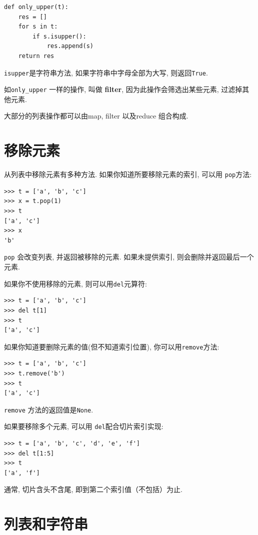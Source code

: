 \documentclass[10pt]{book}
\begin{document}
\begin{verbatim}
def only_upper(t):
    res = []
    for s in t:
        if s.isupper():
            res.append(s)
    return res
\end{verbatim}
%
{\tt isupper}是字符串方法, 如果字符串中字母全部为大写, 则返回{\tt True}. 

如\verb"only_upper" 一样的操作, 叫做 {\bf filter}, 因为此操作会筛选出某些元素, 
过滤掉其他元素. 

大部分的列表操作都可以由map, filter 以及reduce 组合构成. 


\section{移除元素}

从列表中移除元素有多种方法. 
如果你知道所要移除元素的索引, 可以用
{\tt pop}方法:

\begin{verbatim}
>>> t = ['a', 'b', 'c']
>>> x = t.pop(1)
>>> t
['a', 'c']
>>> x
'b'
\end{verbatim}
%
{\tt pop} 会改变列表, 并返回被移除的元素. 
如果未提供索引, 则会删除并返回最后一个元素. 

如果你不使用移除的元素, 则可以用{\tt del}元算符:

\begin{verbatim}
>>> t = ['a', 'b', 'c']
>>> del t[1]
>>> t
['a', 'c']
\end{verbatim}
%
如果你知道要删除元素的值(但不知道索引位置), 你可以用{\tt remove}方法:

\begin{verbatim}
>>> t = ['a', 'b', 'c']
>>> t.remove('b')
>>> t
['a', 'c']
\end{verbatim}
%
{\tt remove} 方法的返回值是{\tt None}.

如果要移除多个元素, 可以用 {\tt del}配合切片索引实现:

\begin{verbatim}
>>> t = ['a', 'b', 'c', 'd', 'e', 'f']
>>> del t[1:5]
>>> t
['a', 'f']
\end{verbatim}
%
通常, 切片含头不含尾, 即到第二个索引值（不包括）为止. 



\section{列表和字符串}
\end{document}
